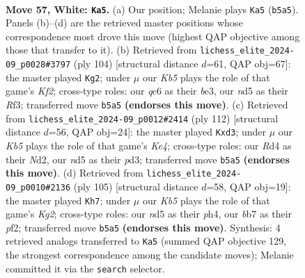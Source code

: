 \documentclass[11pt]{article}
\begin{document}
\clearpage

\begin{figure}[p]\centering
\begin{subfigure}{0.46\textwidth}\centering
\resizebox{\linewidth}{!}{%
\newchessgame
\chessboard[
  setfen={8/1b3pk1/2q3p1/1K1n4/3R3P/8/4R2P/5N2 w - - 21 57},
  showmover=false,
  pgfstyle=straightmove, color=movearrow, markmove={b5-a5}
]}
\caption{}
\end{subfigure}\hfill
\begin{subfigure}{0.46\textwidth}\centering
\resizebox{\linewidth}{!}{%
\newchessgame
\chessboard[
  setfen={7k/6p1/7p/3P4/4q3/4bRP1/5K1P/8 w - - 4 53},
  showmover=false,
  pgfstyle=straightmove, color=movearrow, markmove={f2-g2}
]}
\caption{}
\end{subfigure}
\\[4pt]
\begin{subfigure}{0.46\textwidth}\centering
\resizebox{\linewidth}{!}{%
\newchessgame
\chessboard[
  setfen={6k1/1q4p1/8/1p2P3/4K3/P2p4/3N1R2/8 w - - 4 57},
  showmover=false,
  pgfstyle=straightmove, color=movearrow, markmove={e4-d3}
]}
\caption{}
\end{subfigure}\hfill
\begin{subfigure}{0.46\textwidth}\centering
\resizebox{\linewidth}{!}{%
\newchessgame
\chessboard[
  setfen={8/5pk1/3p3r/3P4/7P/6Q1/4KP2/8 b - - 4 53},
  showmover=false,
  pgfstyle=straightmove, color=movearrow, markmove={g7-h7}
]}
\caption{}
\end{subfigure}
\caption{\textbf{Move 57, White: \texttt{Ka5}.} (a) Our position; Melanie plays \texttt{Ka5} (\texttt{b5a5}). Panels (b)--(d) are the retrieved master positions whose correspondence most drove this move (highest QAP objective among those that transfer to it). (b) Retrieved from \texttt{lichess\_elite\_2024-09\_p0028\#3797} (ply 104) [structural distance $d$=61, QAP obj=67]: the master played \texttt{Kg2}; under $\mu$ our \emph{Kb5} plays the role of that game's \emph{Kf2}; cross-type roles: our \emph{q}c6 as their \emph{b}e3, our \emph{n}d5 as their \emph{R}f3; transferred move \texttt{b5a5} \textbf{(endorses this move)}. (c) Retrieved from \texttt{lichess\_elite\_2024-09\_p0012\#2414} (ply 112) [structural distance $d$=56, QAP obj=24]: the master played \texttt{Kxd3}; under $\mu$ our \emph{Kb5} plays the role of that game's \emph{Ke4}; cross-type roles: our \emph{R}d4 as their \emph{N}d2, our \emph{n}d5 as their \emph{p}d3; transferred move \texttt{b5a5} \textbf{(endorses this move)}. (d) Retrieved from \texttt{lichess\_elite\_2024-09\_p0010\#2136} (ply 105) [structural distance $d$=58, QAP obj=19]: the master played \texttt{Kh7}; under $\mu$ our \emph{Kb5} plays the role of that game's \emph{Kg2}; cross-type roles: our \emph{n}d5 as their \emph{p}h4, our \emph{b}b7 as their \emph{p}f2; transferred move \texttt{b5a5} \textbf{(endorses this move)}. Synthesis: 4 retrieved analogs transferred to \texttt{Ka5} (summed QAP objective 129, the strongest correspondence among the candidate moves); Melanie committed it via the \texttt{search} selector.}
\label{fig:thought-m112}
\end{figure}
\end{document}

